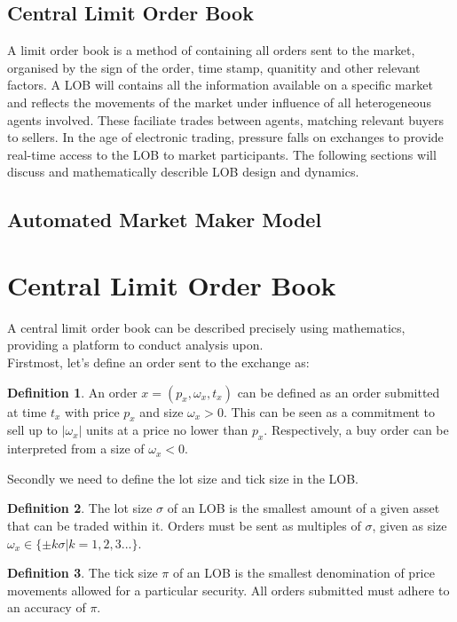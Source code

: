 \documentclass[12pt]{article}
\theoremstyle{definition}
\newtheorem{definition}{Definition}[section]
\begin{document}
\subsection{Central Limit Order Book} 
A limit order book is a method of containing all orders sent to the market,
organised by the sign of the order, time stamp, quanitity and other relevant 
factors. A LOB will contains all the information available on a  specific market
and reflects the movements of the market under influence of all 
heterogeneous agents involved. These faciliate trades between agents, matching 
relevant buyers to sellers. In the age of electronic trading, pressure falls on 
exchanges to provide real-time access to the LOB to market participants. The
following sections will discuss and mathematically describle LOB design
and dynamics.


\subsection{Automated Market Maker Model}


\section{Central Limit Order Book}
A central limit order book can be described precisely using mathematics, 
providing a platform to conduct analysis upon.\\
Firstmost, let's define an order sent to the exchange as: 
\begin{definition}
An order $x = (p_x,\omega_x,t_x)$ can be defined as an order submitted at time 
$t_x$ with price $p_x$  and size $\omega_x > 0$. This can be seen as a commitment to 
 sell up to $| \omega_x |$ units at a price no lower than $p_x$. Respectively,
a buy order can be interpreted from a size of $\omega_x < 0$.  
\end{definition}
Secondly we need to define the lot size and tick size in the LOB. 
 
 \begin{definition}
 The lot size $\sigma$ of an LOB is the smallest amount of a given asset that
   can be traded within it. Orders must be sent as multiples of $\sigma$, given 
   as size $\omega_x \in \{\pm k\sigma | k = 1,2,3 ...\}$.
 \end{definition}

 \begin{definition}
 The tick size $\pi$ of an LOB is the smallest denomination of price movements 
   allowed for a particular security. All orders submitted must adhere to an 
   accuracy of $\pi$.
 \end{definition}
\end{document}
